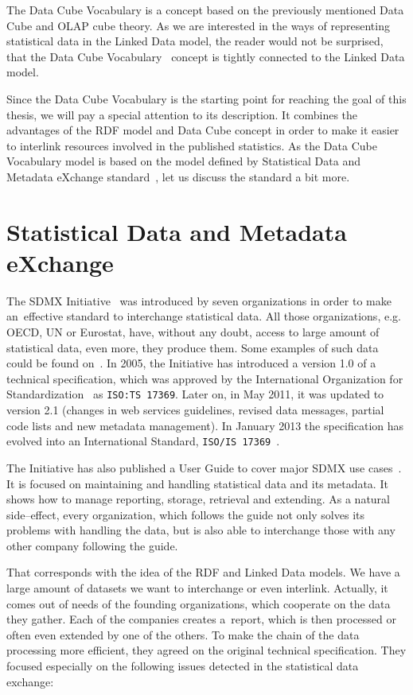 The Data Cube Vocabulary is a concept based on the previously mentioned Data Cube and
OLAP cube theory. As we are interested in the ways of representing statistical data in the
Linked Data model, the reader would not be surprised, that the Data Cube 
Vocabulary~\cite{dcv}
concept is tightly connected to the Linked Data model.

Since the Data Cube Vocabulary is the starting point for reaching the goal of this thesis,
we will pay a special attention to its description. It combines the advantages of the RDF
model and Data Cube concept in order to make it easier to interlink resources involved
in the published statistics. As the Data Cube Vocabulary model is based on the model defined
by Statistical Data and Metadata eXchange standard~\cite{sdmx}, let us discuss the standard a bit more.

\section{Statistical Data and Metadata eXchange}
The SDMX Initiative~\cite{sdmx} was introduced by seven organizations in order to make
an~effective standard to interchange statistical data. All those organizations, e.g. OECD,
UN or Eurostat, have, without any doubt, access to large amount of statistical data, even more,
they produce them. Some examples of such data could be found on~\cite{pubdata}.
In 2005, the Initiative has introduced a
version 1.0 of a technical specification, which was approved by the International
Organization for Standardization~\cite{iso} as \texttt{ISO:TS 17369}.
Later on, in May 2011, it was updated to version 2.1 (changes in web services guidelines,
revised data messages, partial code lists and new metadata management).
In January 2013 the specification has evolved into an International Standard,
\texttt{ISO/IS 17369}~\cite{isosdmx}.

The Initiative has also published a User Guide to cover major SDMX use cases~\cite{sdmxuserguide}.
It is focused on maintaining and handling statistical data and its metadata. It shows
how to manage reporting, storage, retrieval and extending. As a natural side--effect,
every organization, which follows the guide not only solves its problems with
handling the data, but is also able to interchange those with any other company
following the guide.

That corresponds with the idea of the RDF and Linked Data models. We have a large amount
of datasets we want to interchange or even interlink. Actually, it comes out of needs
of the founding organizations, which cooperate on the data they gather. Each of the companies creates
a~report, which is then processed or often even extended by one of the others. To make the chain
of the data processing more efficient, they agreed on the original technical specification.
They focused especially on the following issues detected in the statistical data exchange:

